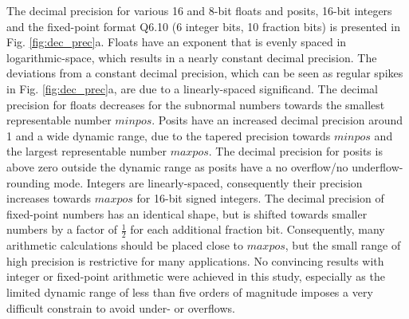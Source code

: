 \documentclass[draft]{agujournal2019}
\begin{document}
The decimal precision for various 16 and 8-bit floats and posits, 16-bit integers
and the fixed-point format Q6.10 (6 integer bits, 10 fraction bits) is presented
in Fig. \ref{fig:dec_prec}a. Floats have an exponent that is evenly spaced in
logarithmic-space, which results in a nearly constant decimal precision. The deviations
from a constant decimal precision, which can be seen as regular spikes in Fig. \ref{fig:dec_prec}a,
are due to a linearly-spaced significand. The decimal precision for floats decreases
for the subnormal numbers towards the smallest representable number $minpos$.
Posits have an increased decimal precision around 1 and a wide dynamic range,
due to the tapered precision towards $minpos$ and the largest representable number
$maxpos$. The decimal precision for posits is above zero outside the dynamic range
as posits have a no overflow/no underflow-rounding mode. Integers are linearly-spaced,
consequently their precision increases towards $maxpos$ for 16-bit signed integers.
The decimal precision of fixed-point numbers has an identical shape, but is shifted
towards smaller numbers by a factor of $\tfrac{1}{2}$ for each additional fraction bit.
Consequently, many arithmetic calculations should be placed close to $maxpos$, but
the small range of high precision is restrictive for many applications. No convincing results
with integer or fixed-point arithmetic were achieved in this study, especially as
the limited dynamic range of less than five orders of magnitude imposes a very difficult
constrain to avoid under- or overflows.
\end{document}
